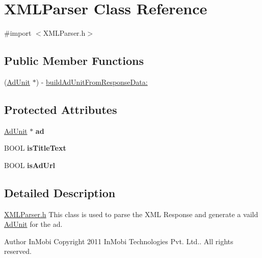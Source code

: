 \hypertarget{interface_x_m_l_parser}{
\section{XMLParser Class Reference}
\label{interface_x_m_l_parser}
}


{\ttfamily \#import $<$XMLParser.h$>$}

\subsection*{Public Member Functions}
\begin{DoxyCompactItemize}
\item 
(\hyperlink{interface_ad_unit}{AdUnit} $\ast$) -\/ \hyperlink{interface_x_m_l_parser_a9fad30c27d268db68fb9767165a31994}{buildAdUnitFromResponseData:}
\end{DoxyCompactItemize}
\subsection*{Protected Attributes}
\begin{DoxyCompactItemize}
\item 
\hypertarget{interface_x_m_l_parser_a462a71d35fc53fb0a4af50d0c417487b}{
\hyperlink{interface_ad_unit}{AdUnit} $\ast$ {\bfseries ad}}
\label{interface_x_m_l_parser_a462a71d35fc53fb0a4af50d0c417487b}

\item 
\hypertarget{interface_x_m_l_parser_a12b83b2e87e21ba0524770935f5a0efa}{
BOOL {\bfseries isTitleText}}
\label{interface_x_m_l_parser_a12b83b2e87e21ba0524770935f5a0efa}

\item 
\hypertarget{interface_x_m_l_parser_a2a513a2a522d723a9ad788707d731263}{
BOOL {\bfseries isAdUrl}}
\label{interface_x_m_l_parser_a2a513a2a522d723a9ad788707d731263}

\end{DoxyCompactItemize}


\subsection{Detailed Description}
\hyperlink{_x_m_l_parser_8h_source}{XMLParser.h} This class is used to parse the XML Response and generate a vaild \hyperlink{interface_ad_unit}{AdUnit} for the ad. \begin{DoxyAuthor}{Author}
InMobi Copyright 2011 InMobi Technologies Pvt. Ltd.. All rights reserved. 
\end{DoxyAuthor}


